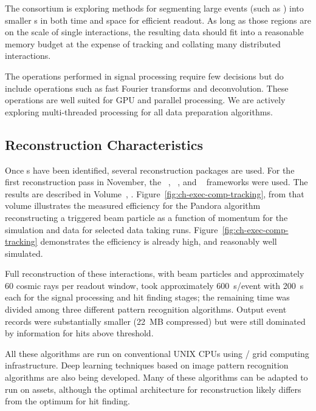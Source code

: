 The  consortium is exploring methods for segmenting large events (such as ) into  smaller s in both time and space for efficient readout.  As long as those regions are on the scale of single interactions, the resulting data should fit into a reasonable memory budget at the expense of tracking and collating many distributed interactions. 

The operations performed in signal processing require few decisions but do include operations such as fast Fourier transforms and deconvolution.  These operations are well suited for GPU and parallel processing. We are actively exploring multi-threaded processing for all data preparation algorithms. 


\subsection{Reconstruction Characteristics}

Once s have been identified, several \threed  reconstruction packages are used. For the first reconstruction pass in November, the  ~\cite{Acciarri:2017hat}, ~\cite{wirecell}, and ~\cite{ref:PMA}  frameworks were used. The results are described in Volume~\volnumberphysics{}, \voltitlephysics{}. 
Figure~\ref{fig:ch-exec-comp-tracking}, from that volume illustrates the measured efficiency for the Pandora algorithm reconstructing a triggered beam particle as a function of momentum for the simulation and data for selected data taking runs. Figure~\ref{fig:ch-exec-comp-tracking} demonstrates the efficiency is already high, and reasonably well simulated.

Full reconstruction of these  interactions, with beam particles and approximately 60 cosmic rays per readout window, took  approximately \SI{600}{s/event} with \SI{200}{s} each for the signal processing and hit finding stages; the remaining time was divided among three different pattern recognition algorithms. Output event records were substantially smaller (\SI{22}{MB} compressed) but were still dominated by information for  hits above threshold. 

All these algorithms are run on conventional UNIX CPUs using / grid computing  infrastructure. Deep learning techniques based on image pattern recognition algorithms are also being developed. Many of these algorithms can be adapted to run on  assets, although the optimal architecture for \threed reconstruction likely differs from the optimum for hit finding.


